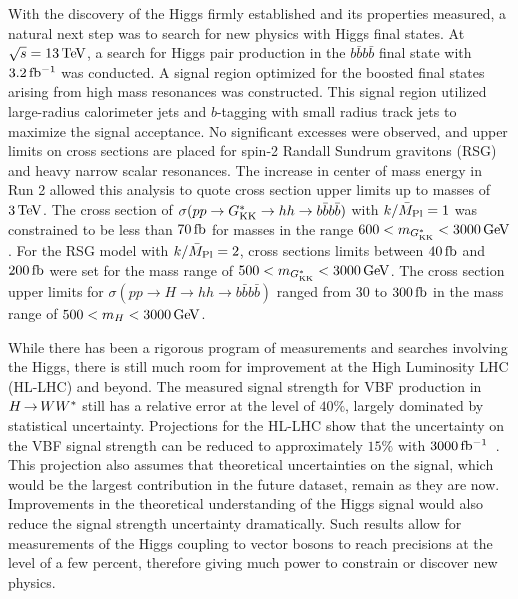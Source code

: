 With the discovery of the Higgs firmly established and its properties measured, a natural next step was to search for new physics with Higgs final states. At $\sqrt{s} = 13 \TeV$, a search for Higgs pair production in the $b\bar{b}b\bar{b}$ final state with $3.2\mbox{\,fb$^{-1}$}$ was conducted. A signal region optimized for the boosted final states arising from high mass resonances was constructed. This signal region utilized large-radius calorimeter jets and $b$-tagging with small radius track jets to maximize the signal acceptance. No significant excesses were observed, and upper limits on cross sections are placed for spin-2 Randall Sundrum gravitons (RSG) and heavy narrow scalar resonances. The increase in center of mass energy in Run 2 allowed this analysis to quote cross section upper limits up to masses of $3 \TeV$. The cross section of $\sigma(pp \to G^*_{\rm KK} \to hh \to b\bar{b}b\bar{b})$ with $k/\bar{M}_{\rm Pl}=1$ was constrained to be less than $70 \mbox{\,fb}$ for masses in the range $600 < m_{\Gkk} < 3000 \GeV$. For the RSG model with $k/\bar{M}_{\rm Pl}=2$, cross sections limits between $40\mbox{\,fb}$ and $200 \mbox{\,fb}$ were set for the mass range of $500 < m_{\Gkk} < 3000 \GeV$. The cross section upper limits for $\sigma(pp \to H \to hh \to b\bar{b}b\bar{b})$ ranged from $30$ to $300 \mbox{\,fb}$ in the mass range of $500 < m_{H} < 3000 \GeV$. 

While there has been a rigorous program of measurements and searches involving the Higgs, there is still much room for improvement at the High Luminosity LHC (HL-LHC) and beyond. The measured signal strength for VBF production in $H{\,{\rightarrow}\,}WW^\ast$ still has a relative error at the level of $40\%$, largely dominated by statistical uncertainty. Projections for the HL-LHC show that the uncertainty on the VBF signal strength can be reduced to approximately $15\%$ with $3000 \mbox{\,fb$^{-1}$}$~\cite{HiggsProj,ScopingDocument}. This projection also assumes that theoretical uncertainties on the signal, which would be the largest contribution in the future dataset, remain as they are now. Improvements in the theoretical understanding of the Higgs signal would also reduce the signal strength uncertainty dramatically. Such results allow for measurements of the Higgs coupling to vector bosons to reach precisions at the level of a few percent, therefore giving much power to constrain or discover new physics. 

